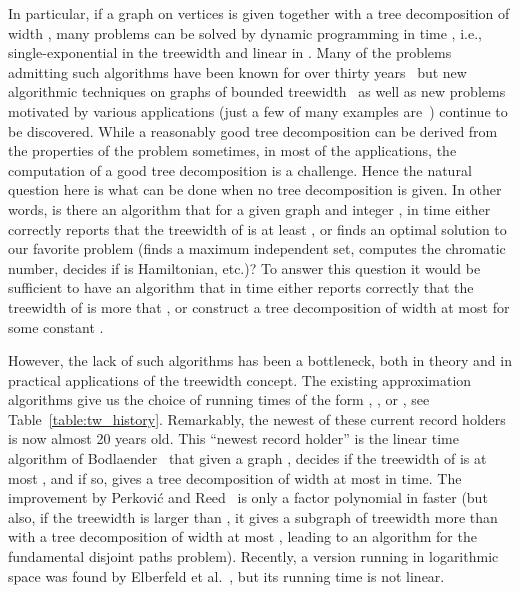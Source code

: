 \documentclass[a4paper,11pt]{article}
\theoremstyle{definition}
\theoremstyle{remark}
\begin{document}
In particular, if a graph on  vertices is given together with a
tree decomposition of width , many problems can be solved by
dynamic programming in time , i.e., single-exponential in
the treewidth and linear in .  Many of the problems admitting such
algorithms have been known for over thirty years~\cite{Bodlaender87}
but new algorithmic techniques on graphs of bounded
treewidth~\cite{BodlaenderCKN12, CyganKN12} as well as new problems
motivated by various applications (just a few of many examples
are~\cite{AbrahamBDR12,Gildea11,KosterHK02,RinaudoPBD12}) continue to
be discovered.  While a reasonably good tree decomposition can be
derived from the properties of the problem sometimes, in most of the
applications, the computation of a good tree decomposition is a
challenge.
Hence the natural question here is what can be done when no tree
decomposition is given.  In other words, is there an algorithm that
for a given graph  and integer , in time  either
correctly reports that the treewidth of  is at least , or finds
an optimal solution to our favorite problem (finds a maximum
independent set, computes the chromatic number, decides if  is
Hamiltonian, etc.)?  To answer this question it would be sufficient to
have an algorithm that in time  either reports correctly
that the treewidth of  is more that , or construct a tree
decomposition of width at most  for some constant .

However, the lack of such algorithms has been a bottleneck, both in
theory and in practical applications of the treewidth concept.  The
existing approximation algorithms give us the choice of running times
of the form , , or
, see Table~\ref{table:tw_history}.  Remarkably, the
newest of these current record holders is now almost 20 years old.
This ``newest record holder'' is the linear time algorithm of
Bodlaender~\cite{Bodlaender93s,Bodlaender96} that given a graph ,
decides if the treewidth of  is at most , and if so, gives a
tree decomposition of width at most  in  time.  The
improvement by Perkovi{\'{c}} and Reed~\cite{PerkovicR00} is only a
factor polynomial in  faster (but also, if the treewidth is larger
than , it gives a subgraph of treewidth more than  with a tree
decomposition of width at most , leading to an  algorithm
for the fundamental disjoint paths problem).  Recently, a version
running in logarithmic space was found by Elberfeld et
al.~\cite{ElberfeldJT10}, but its running time is not linear.
\end{document}
